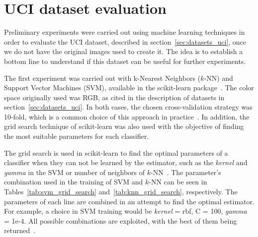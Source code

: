 \section{UCI dataset evaluation}
\label{sec:ml_experiments}
Preliminary experiments were carried out using machine learning techniques in order to evaluate the UCI dataset, described in section~\ref{sec:datasets_uci}, once we do not have the original images used to create it. The idea is to establish a bottom line to understand if this dataset can be useful for further experiments.

The first experiment was carried out with k-Nearest Neighbors ($k$-NN) and Support Vector Machines (SVM), available in the scikit-learn package~\citep{scikit-learn:11}. The color space originally used was RGB, as cited in the description of datasets in section~\ref{sec:datasets_uci}. In both cases, the chosen cross-validation strategy was 10-fold, which is a common choice of this approach in practice~\citep{mostafa:12}. In addition, the grid search technique of scikit-learn was also used with the objective of finding the most suitable parameters for each classifier.

The grid search is used in scikit-learn to find the optimal parameters of a classifier when they can not be learned by the estimator, such as the \emph{kernel} and \emph{gamma} in the SVM or number of neighbors of $k$-NN~\citep{scikit-learn:11}. The parameter's combination used in the training of SVM and $k$-NN can be seen in Tables~\ref{tab:svm_grid_search} and~\ref{tab:knn_grid_search}, respectively. The parameters of each line are combined in an attempt to find the optimal estimator. For example, a choice in SVM training would be \emph{kernel} = rbf, C = 100, \emph{gamma} = 1e-4. All possible combinations are exploited, with the best of them being returned~\citep{scikit-learn:11}.

